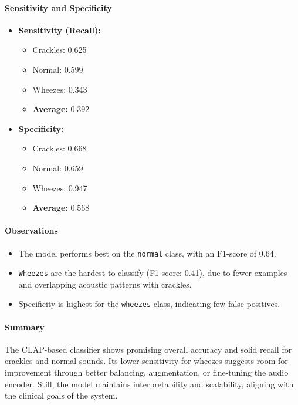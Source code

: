\paragraph{Sensitivity and Specificity\\}
\begin{itemize}
    \item \textbf{Sensitivity (Recall):}
    \begin{itemize}
        \item Crackles: 0.625
        \item Normal: 0.599
        \item Wheezes: 0.343
        \item \textbf{Average:} 0.392
    \end{itemize}
    
    \item \textbf{Specificity:}
    \begin{itemize}
        \item Crackles: 0.668
        \item Normal: 0.659
        \item Wheezes: 0.947
        \item \textbf{Average:} 0.568
    \end{itemize}
\end{itemize}

\paragraph{Observations\\}
\begin{itemize}
    \item The model performs best on the \texttt{normal} class, with an F1-score of 0.64.
    \item \texttt{Wheezes} are the hardest to classify (F1-score: 0.41), due to fewer examples and overlapping acoustic patterns with crackles.
    \item Specificity is highest for the \texttt{wheezes} class, indicating few false positives.
\end{itemize}

\paragraph{Summary\\}
The CLAP-based classifier shows promising overall accuracy and solid recall for crackles and normal sounds. Its lower sensitivity for wheezes suggests room for improvement through better balancing, augmentation, or fine-tuning the audio encoder. Still, the model maintains interpretability and scalability, aligning with the clinical goals of the system.